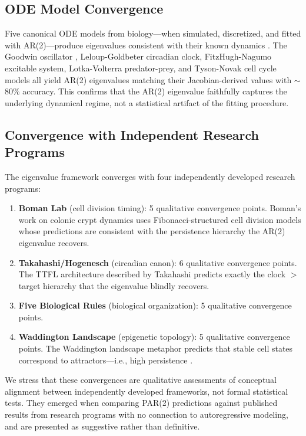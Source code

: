 \documentclass[11pt,letterpaper]{article}
\begin{document}
\subsection{ODE Model Convergence}

Five canonical ODE models from biology---when simulated, discretized, and fitted with AR(2)---produce eigenvalues consistent with their known dynamics \citep{whiteside2026par2a}. The Goodwin oscillator \citep{goodwin1965oscillatory}, Leloup-Goldbeter circadian clock, FitzHugh-Nagumo excitable system, Lotka-Volterra predator-prey, and Tyson-Novak cell cycle models all yield AR(2) eigenvalues matching their Jacobian-derived values with $\sim$80\% accuracy. This confirms that the AR(2) eigenvalue faithfully captures the underlying dynamical regime, not a statistical artifact of the fitting procedure.

\subsection{Convergence with Independent Research Programs}

The eigenvalue framework converges with four independently developed research programs:

\begin{enumerate}
\item \textbf{Boman Lab} (cell division timing): 5 qualitative convergence points. Boman's work on colonic crypt dynamics \citep{boman2025biolcell} uses Fibonacci-structured cell division models whose predictions are consistent with the persistence hierarchy the AR(2) eigenvalue recovers.
\item \textbf{Takahashi/Hogenesch} (circadian canon): 6 qualitative convergence points. The TTFL architecture described by Takahashi \citep{takahashi2017transcriptional} predicts exactly the clock $>$ target hierarchy that the eigenvalue blindly recovers.
\item \textbf{Five Biological Rules} (biological organization): 5 qualitative convergence points.
\item \textbf{Waddington Landscape} (epigenetic topology): 5 qualitative convergence points. The Waddington landscape metaphor predicts that stable cell states correspond to attractors---i.e., high persistence \citep{heard2014transgenerational}.
\end{enumerate}

We stress that these convergences are qualitative assessments of conceptual alignment between independently developed frameworks, not formal statistical tests. They emerged when comparing PAR(2) predictions against published results from research programs with no connection to autoregressive modeling, and are presented as suggestive rather than definitive.
\end{document}
